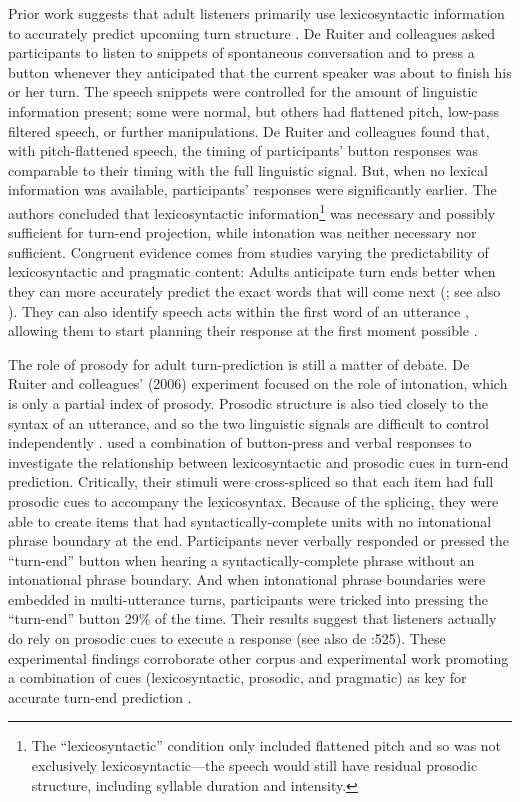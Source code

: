 \documentclass[authoryear, 12pt]{elsarticle}
\begin{document}
Prior work suggests that adult listeners primarily use lexicosyntactic information to accurately predict upcoming turn structure \citep{de-ruiter2006}. De Ruiter and colleagues \citeyearpar{de-ruiter2006} asked participants to listen to snippets of spontaneous conversation and to press a button whenever they anticipated that the current speaker was about to finish his or her turn. The speech snippets were controlled for the amount of linguistic information present; some were normal, but others had flattened pitch, low-pass filtered speech, or further manipulations. De Ruiter and colleagues found that, with pitch-flattened speech, the timing of participants' button responses was comparable to their timing with the full linguistic signal. But, when no lexical information was available, participants' responses were significantly earlier. The authors concluded that lexicosyntactic information\footnote{The ``lexicosyntactic'' condition only included flattened pitch and so was not exclusively lexicosyntactic---the speech would still have residual prosodic structure, including syllable duration and intensity.} was necessary and possibly sufficient for turn-end projection, while intonation was neither necessary nor sufficient. Congruent evidence comes from studies varying the predictability of lexicosyntactic and pragmatic content: Adults anticipate turn ends better when they can more accurately predict the exact words that will come next (\citealp{magyari2012}; see also \citealp{magyari2014}). They can also identify speech acts within the first word of an utterance \citep{gisladottir2015}, allowing them to start planning their response at the first moment possible \citep{bogels2015}.

The role of prosody for adult turn-prediction is still a matter of debate. De Ruiter and colleagues' (2006) experiment focused on the role of intonation, which is only a partial index of prosody. Prosodic structure is also tied closely to the syntax of an utterance, and so the two linguistic signals are difficult to control independently \citep{ford1996}. \citet*{torreira2015} used a combination of button-press and verbal responses to investigate the relationship between lexicosyntactic and prosodic cues in turn-end prediction. Critically, their stimuli were cross-spliced so that each item had full prosodic cues to accompany the lexicosyntax. Because of the splicing, they were able to create items that had syntactically-complete units with no intonational phrase boundary at the end. Participants never verbally responded or pressed the ``turn-end'' button when hearing a syntactically-complete phrase without an intonational phrase boundary. And when intonational phrase boundaries were embedded in multi-utterance turns, participants were tricked into pressing the ``turn-end'' button 29\% of the time. Their results suggest that listeners actually do rely on prosodic cues to execute a response (see also de \citet{de-ruiter2006}:525). These experimental findings corroborate other corpus and experimental work promoting a combination of cues (lexicosyntactic, prosodic, and pragmatic) as key for accurate turn-end prediction \citep{duncan1972, ford1996, hirvenkari2013}.
\end{document}
